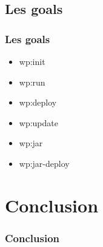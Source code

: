 \documentclass[12pt,a4paper,utf8x]{beamer}
\begin{document}
\subsection*{Les goals}
\begin{frame}\frametitle{Les goals}
\begin{itemize}
\item wp:init
\item wp:run
\item wp:deploy
\item wp:update
\item wp:jar
\item wp:jar-deploy
\end{itemize}

\end{frame}	

\section{Conclusion}
\begin{frame}\frametitle{Conclusion}

\end{frame}	
\end{document}
